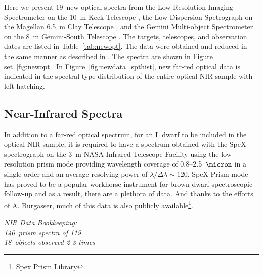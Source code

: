 \documentclass[12pt,preprint]{aastex}
\newcommand{\newopt}{19} %
\newcommand{\prismspectra}{140} %
\newcommand{\dupes}{18} %
\newcommand{\objects}{119} %
\begin{document}

\label{sec:obs_new_opt}

Here we present \newopt~new optical spectra from the Low Resolution Imaging Spectrometer on the 10~m Keck Telescope \citep[LRIS]{LRIS}, the Low Dispersion Spetrograph on the Magellan 6.5~m Clay Telescope \citep[LDSS-3]{LDSS2}, and the Gemini Multi-object Spectrometer on the 8~m Gemini-South Telescope \citep[GMOS]{GMOS}.
The targets, telescopes, and observation dates are listed in Table~\ref{tab:newopt}. 
The data were obtained and reduced in the same manner as described in \citet{Kirkpatrick10}. 
The spectra are shown in Figure set~\ref{fig:newopt}.
In Figure~\ref{fig:newdata_spthist}, new far-red optical data is indicated in the spectral type distribution of the entire optical-NIR sample with left hatching.

\subsection{Near-Infrared Spectra}

In addition to a far-red optical spectrum, for an L dwarf to be included in the optical-NIR sample, it is required to have a spectrum obtained with the SpeX spectrograph \citep{Spex} on the 3~m NASA Infrared Telescope Facility using the low-resolution prism mode providing wavelength coverage of 0.8--2.5~$\micron$ in a single order and an average resolving power of $\lambda/\Delta\lambda\sim120$.
SpeX Prism mode has proved to be a popular workhorse instrument for brown dwarf spectroscopic follow-up and as a result, there are a plethora of data. And thanks to the efforts of A. Burgasser, much of this data is also publicly available\footnote{Spex Prism Library}. 

\label{sec:obs_new_nir}

\emph{NIR Data Bookkeeping: \\
\prismspectra~prism spectra of \objects \\
\dupes~objects observed 2-3 times}
\end{document}
